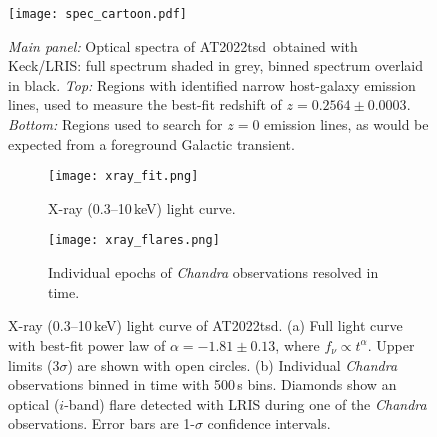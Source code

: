 \documentclass{nature_plusfigure}
\newcommand{\at}{AT2022tsd}
\begin{document}
\begin{extended_data}

\renewcommand{\thefigure}{\arabic{figure}~Extended~Data}
\renewcommand{\thefigure}{Extended Data Figure \arabic{figure}}
\renewcommand{\figurename}{}
\setcounter{figure}{0}

\renewcommand{\thetable}{\arabic{table}~Extended~Data}
\renewcommand{\thetable}{Extended Data Table \arabic{table}}
\renewcommand{\tablename}{}
\setcounter{table}{0}

\begin{figure}[ht]
 \centering
\texttt{[image: spec\_cartoon.pdf]}
  \caption{\emph{Main panel:} Optical spectra of \at\ obtained with Keck/LRIS: full spectrum shaded in grey, binned spectrum overlaid in black. \emph{Top:} Regions with identified narrow host-galaxy emission lines, used to measure the best-fit redshift of $z=0.2564\pm0.0003$. \emph{Bottom:} Regions used to search for $z=0$ emission lines, as would be expected from a foreground Galactic transient.}
 \label{fig:spec}
\end{figure}

\begin{figure}[!ht]
 \centering
 \begin{subfigure}[t]{1.0\textwidth}
 	\centering
	\texttt{[image: xray\_fit.png]}
	\caption{X-ray (0.3--10\,keV) light curve.}
 \end{subfigure}
 \begin{subfigure}[t]{1.0\textwidth}
 	\centering
	\texttt{[image: xray\_flares.png]}
	\caption{Individual epochs of {\it Chandra} observations resolved in time.}
 \end{subfigure}
  \caption{X-ray (0.3--10\,keV) light curve of \at. (a) Full light curve with best-fit power law of $\alpha=-1.81\pm0.13$, where $f_\nu \propto t^{\alpha}$. Upper limits (3$\sigma$) are shown with open circles. (b) Individual {\it Chandra} observations binned in time with 500\,s bins. Diamonds show an optical ($i$-band) flare detected with LRIS during one of the {\it Chandra} observations. Error bars are 1-$\sigma$ confidence intervals.}
 \label{fig:xray-lc}
\end{figure}


\end{extended_data}
\end{document}
